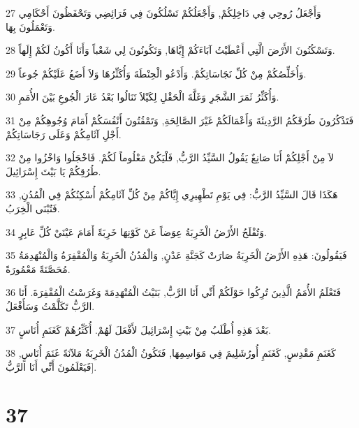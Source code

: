 \par 27 وَأَجْعَلُ رُوحِي فِي دَاخِلِكُمْ, وَأَجْعَلُكُمْ تَسْلُكُونَ فِي فَرَائِضِي وَتَحْفَظُونَ أَحْكَامِي وَتَعْمَلُونَ بِهَا.
\par 28 وَتَسْكُنُونَ الأَرْضَ الَّتِي أَعْطَيْتُ آبَاءَكُمْ إِيَّاهَا, وَتَكُونُونَ لِي شَعْباً وَأَنَا أَكُونُ لَكُمْ إِلَهاً.
\par 29 وَأُخَلِّصُكُمْ مِنْ كُلِّ نَجَاسَاتِكُمْ. وَأَدْعُو الْحِنْطَةَ وَأُكَثِّرُهَا وَلاَ أَضَعُ عَلَيْكُمْ جُوعاً.
\par 30 وَأُكَثِّرُ ثَمَرَ الشَّجَرِ وَغَلَّةَ الْحَقْلِ لِكَيْلاَ تَنَالُوا بَعْدُ عَارَ الْجُوعِ بَيْنَ الأُمَمِ.
\par 31 فَتَذْكُرُونَ طُرُقَكُمُ الرَّدِيئَةَ وَأَعْمَالَكُمْ غَيْرَ الصَّالِحَةِ, وَتَمْقُتُونَ أَنْفُسَكُمْ أَمَامَ وُجُوهِكُمْ مِنْ أَجْلِ آثَامِكُمْ وَعَلَى رَجَاسَاتِكُمْ.
\par 32 لاَ مِنْ أَجْلِكُمْ أَنَا صَانِعٌ يَقُولُ السَّيِّدُ الرَّبُّ, فَلْيَكُنْ مَعْلُوماً لَكُمْ. فَاخْجَلُوا وَاخْزُوا مِنْ طُرُقِكُمْ يَا بَيْتَ إِسْرَائِيلَ.
\par 33 هَكَذَا قَالَ السَّيِّدُ الرَّبُّ: فِي يَوْمِ تَطْهِيرِي إِيَّاكُمْ مِنْ كُلِّ آثَامِكُمْ أُسْكِنُكُمْ فِي الْمُدُنِ, فَتُبْنَى الْخِرَبُ.
\par 34 وَتُفْلَحُ الأَرْضُ الْخَرِبَةُ عِوَضاً عَنْ كَوْنِهَا خَرِبَةً أَمَامَ عَيْنَيْ كُلِّ عَابِرٍ.
\par 35 فَيَقُولُونَ: هَذِهِ الأَرْضُ الْخَرِبَةُ صَارَتْ كَجَنَّةِ عَدْنٍ, وَالْمُدُنُ الْخَرِبَةُ وَالْمُقْفِرَةُ وَالْمُنْهَدِمَةُ مُحَصَّنَةً مَعْمُورَةً.
\par 36 فَتَعْلَمُ الأُمَمُ الَّذِينَ تُرِكُوا حَوْلَكُمْ أَنِّي أَنَا الرَّبُّ, بَنَيْتُ الْمُنْهَدِمَةَ وَغَرَسْتُ الْمُقْفِرَةَ. أَنَا الرَّبُّ تَكَلَّمْتُ وَسَأَفْعَلُ.
\par 37 بَعْدَ هَذِهِ أُطْلَبُ مِنْ بَيْتِ إِسْرَائِيلَ لأَفْعَلَ لَهُمْ. أُكَثِّرُهُمْ كَغَنَمِ أُنَاسٍ.
\par 38 كَغَنَمِ مَقْدِسٍ, كَغَنَمِ أُورُشَلِيمَ فِي مَوَاسِمِهَا, فَتَكُونُ الْمُدُنُ الْخَرِبَةُ مَلآنَةً غَنَمَ أُنَاسٍ, فَيَعْلَمُونَ أَنِّي أَنَا الرَّبُّ].

\chapter{37}

